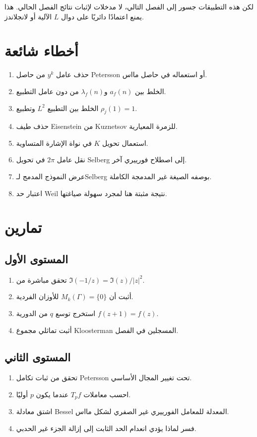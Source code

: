 لكن هذه التطبيقات جسور إلى الفصل التالي، لا مدخلات لإثبات نتائج الفصل
الحالي. هذا يمنع اعتمادًا دائريًا على دوال \(L\) الآلية أو لانجلاندز.

\section{أخطاء شائعة}

\begin{enumerate}
  \item حذف عامل \(y^k\) من حاصل Petersson أو استعماله في حاصل مااس.
  \item الخلط بين \(a_f(n)\) و\(\lambda_f(n)\) من دون عامل التطبيع.
  \item الخلط بين التطبيع \(L^2\) وتطبيع \(\rho_j(1)=1\).
  \item حذف طيف Eisenstein من Kuznetsov للزمرة المعيارية.
  \item استعمال تحويل \(K\) في نواة الإشارة المتساوية.
  \item نقل عامل \(2\pi\) في تحويل Selberg إلى اصطلاح فورييري آخر.
  \item عرض النموذج المدمج لـSelberg بوصفه الصيغة غير المدمجة الكاملة.
  \item اعتبار حد Weil نتيجة مثبتة هنا لمجرد سهولة صياغتها.
\end{enumerate}

\section{تمارين}

\subsection{المستوى الأول}
\begin{enumerate}
  \item تحقق مباشرة من \(\Im(-1/z)=\Im(z)/|z|^2\).
  \item أثبت أن \(M_k(\Gamma)=\{0\}\) للأوزان الفردية.
  \item استخرج توسع \(q\) من الدورية \(f(z+1)=f(z)\).
  \item أثبت تماثلي مجموع Kloosterman المسجلين في الفصل.
\end{enumerate}

\subsection{المستوى الثاني}
\begin{enumerate}
  \item تحقق من ثبات تكامل Petersson تحت تغيير المجال الأساسي.
  \item احسب معاملات \(T_pf\) عندما يكون \(p\) أوليًا.
  \item اشتق معادلة Bessel المعدلة للمعامل الفورييري غير الصفري لشكل مااس.
  \item فسر لماذا يؤدي انعدام الحد الثابت إلى إزالة الجزء غير الحدبي.
\end{enumerate}

